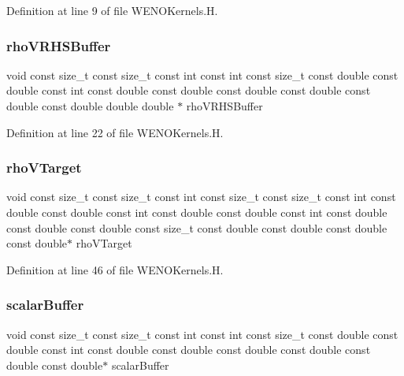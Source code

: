 Definition at line 9 of file W\+E\+N\+O\+Kernels.\+H.

\hypertarget{WENOKernels_8H_a128c5ac60a5f3c4902dd8fc9df37eb18}{}\label{WENOKernels_8H_a128c5ac60a5f3c4902dd8fc9df37eb18} 
\subsubsection{\texorpdfstring{rho\+V\+R\+H\+S\+Buffer}{rhoVRHSBuffer}}
{\footnotesize\ttfamily void const size\+\_\+t const size\+\_\+t const int const int const size\+\_\+t const double const double const int const double const double const double const double const double const double double double $\ast$ rho\+V\+R\+H\+S\+Buffer}



Definition at line 22 of file W\+E\+N\+O\+Kernels.\+H.

\hypertarget{WENOKernels_8H_a69efdc45672ceb8fb33b5e7d1971a4d4}{}\label{WENOKernels_8H_a69efdc45672ceb8fb33b5e7d1971a4d4} 
\subsubsection{\texorpdfstring{rho\+V\+Target}{rhoVTarget}}
{\footnotesize\ttfamily void const size\+\_\+t const size\+\_\+t const int const size\+\_\+t const size\+\_\+t const int const double const double const int const double const double const int const double const double const double const size\+\_\+t const double const double const double const double$\ast$ rho\+V\+Target}



Definition at line 46 of file W\+E\+N\+O\+Kernels.\+H.

\hypertarget{WENOKernels_8H_ae53b6c0ad2686009b00d987ad35f4810}{}\label{WENOKernels_8H_ae53b6c0ad2686009b00d987ad35f4810} 
\subsubsection{\texorpdfstring{scalar\+Buffer}{scalarBuffer}}
{\footnotesize\ttfamily void const size\+\_\+t const size\+\_\+t const int const int const size\+\_\+t const double const double const int const double const double const double const double const double const double$\ast$ scalar\+Buffer}



